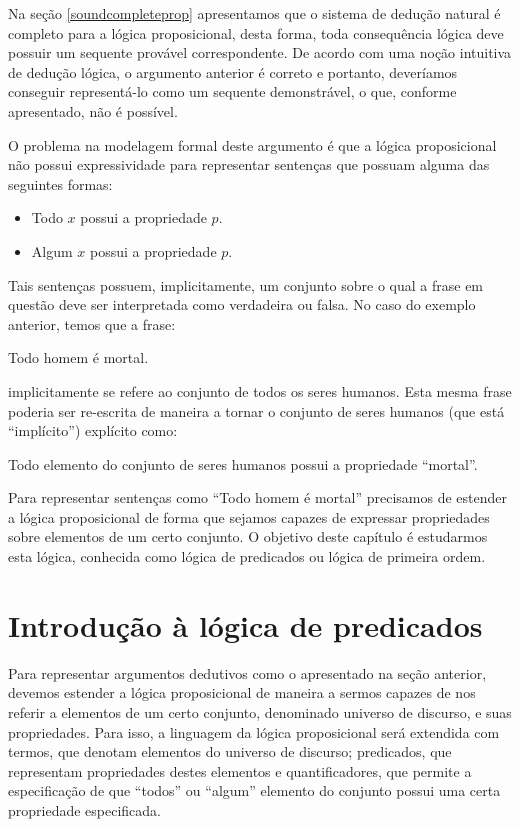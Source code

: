 Na seção \ref{soundcompleteprop} apresentamos que o sistema de dedução
natural é completo para a lógica proposicional, desta forma, toda
consequência lógica deve possuir um sequente provável
correspondente. De acordo com uma noção intuitiva de dedução lógica, o
argumento anterior é correto e portanto, deveríamos conseguir
representá-lo como um sequente demonstrável, o que, conforme
apresentado, não é possível.

O problema na modelagem formal deste argumento é que a lógica proposicional não possui expressividade para
representar sentenças que possuam alguma das seguintes formas:
\begin{itemize}
  \item Todo $x$ possui a propriedade $p$.
  \item Algum $x$ possui a propriedade $p$.
\end{itemize}
Tais sentenças possuem, implicitamente, um conjunto sobre o qual a
frase em questão deve ser interpretada como verdadeira ou falsa. No
caso do exemplo anterior, temos que a frase:
\begin{center}
Todo homem é mortal.
\end{center}
implicitamente se refere ao conjunto de todos os seres humanos. Esta
mesma frase poderia ser re-escrita de maneira a tornar o conjunto  de
seres humanos (que está ``implícito'') explícito como:
\begin{center}
Todo elemento do conjunto de seres humanos possui a propriedade ``mortal''.
\end{center}
Para representar sentenças como ``Todo homem é mortal'' precisamos de
estender a lógica proposicional de forma que sejamos capazes de
expressar propriedades sobre elementos de um certo conjunto. O
objetivo deste capítulo é estudarmos esta lógica, conhecida como
lógica de predicados ou lógica de primeira ordem.

\section{Introdução à lógica de predicados}

Para representar argumentos dedutivos como o apresentado na seção
anterior, devemos estender a lógica proposicional de maneira a sermos
capazes de nos referir a elementos de um certo conjunto, denominado
universo de discurso, e suas
propriedades. Para isso, a linguagem da lógica proposicional será
extendida com termos, que denotam elementos do universo de discurso;
predicados, que representam propriedades destes elementos
e quantificadores, que permite a especificação de que ``todos'' ou
``algum'' elemento do conjunto possui uma certa propriedade
especificada.

